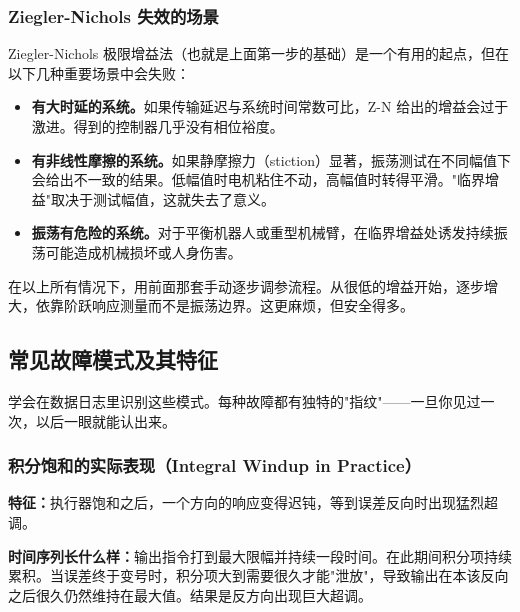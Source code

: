 \subsubsection{Ziegler-Nichols 失效的场景}

Ziegler-Nichols 极限增益法（也就是上面第一步的基础）是一个有用的起点，但在以下几种重要场景中会失败：

\begin{itemize}
    \item \textbf{有大时延的系统。}如果传输延迟与系统时间常数可比，Z-N 给出的增益会过于激进。得到的控制器几乎没有相位裕度。

    \item \textbf{有非线性摩擦的系统。}如果静摩擦力（stiction）显著，振荡测试在不同幅值下会给出不一致的结果。低幅值时电机粘住不动，高幅值时转得平滑。"临界增益"取决于测试幅值，这就失去了意义。

    \item \textbf{振荡有危险的系统。}对于平衡机器人或重型机械臂，在临界增益处诱发持续振荡可能造成机械损坏或人身伤害。
\end{itemize}

在以上所有情况下，用前面那套手动逐步调参流程。从很低的增益开始，逐步增大，依靠阶跃响应测量而不是振荡边界。这更麻烦，但安全得多。

\subsection{常见故障模式及其特征}

学会在数据日志里识别这些模式。每种故障都有独特的"指纹"——一旦你见过一次，以后一眼就能认出来。

\subsubsection{积分饱和的实际表现（Integral Windup in Practice）}

\textbf{特征：}执行器饱和之后，一个方向的响应变得迟钝，等到误差反向时出现猛烈超调。

\textbf{时间序列长什么样：}输出指令打到最大限幅并持续一段时间。在此期间积分项持续累积。当误差终于变号时，积分项大到需要很久才能"泄放"，导致输出在本该反向之后很久仍然维持在最大值。结果是反方向出现巨大超调。

